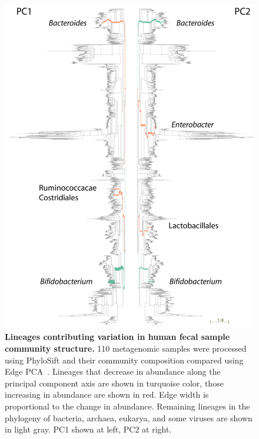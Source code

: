 \documentclass[10pt]{article}
\begin{document}
\begin{figure}[hp]
\begin{center}
\includegraphics[width=6in]{figures/both_prettylike_b2b.png}
\end{center}
\caption{\textbf{Lineages contributing variation in human fecal sample community structure.} 110 metagenomic samples were processed using PhyloSift and their community composition compared using Edge PCA~\cite{Matsen2012}. Lineages that decrease in abundance along the principal component axis are shown in turquoise color, those increasing in abundance are shown in red. Edge width is proportional to the change in abundance. Remaining lineages in the phylogeny of bacteria, archaea, eukarya, and some viruses are shown in light gray. PC1 shown at left, PC2 at right.}
\label{fig:pcaphylo}
\end{figure}
\end{document}
